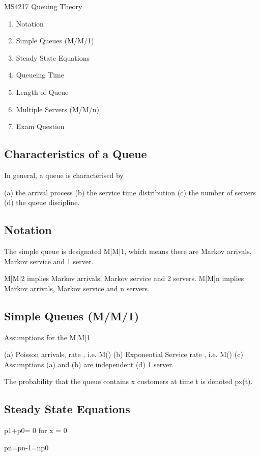
MS4217 Queuing Theory

\begin{enumerate}
\item Notation
\item Simple Queues (M/M/1)
\item Steady State Equations
\item Queueing Time
\item Length of Queue
\item Multiple Servers (M/M/n)
\item Exam Question
\end{enumerate}

\subsection{Characteristics of a Queue}
In general, a queue is characterised by

(a) the arrival process
(b) the service time distribution
(c) the number of servers
(d) the queue discipline.


\subsection{Notation}
The simple queue is designated M|M|1, which means there are Markov arrivals, Markov service and 1 server. 

M|M|2 implies Markov arrivals, Markov service and 2 servers. M|M|n implies Markov arrivals, Markov service and n servers.



\subsection{Simple Queues (M/M/1)}
Assumptions for the M|M|1

(a) Poisson arrivals, rate , i.e. M()
(b) Exponential Service rate , i.e. M()
(c) Assumptions (a) and (b) are independent
(d) 1 server.

The probability that the queue contains x customers at time t is denoted px(t).

\subsection{Steady State Equations}
p1+p0= 0 for x = 0

pn=pn-1=np0

